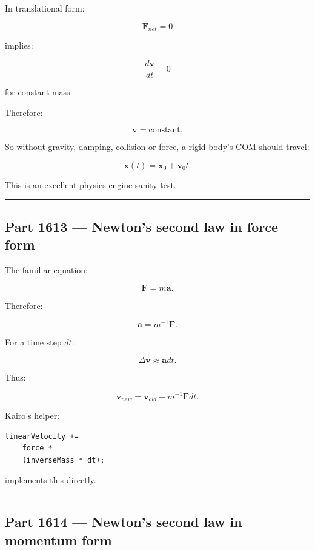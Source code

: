 In translational form:

\[
\mathbf{F}_{net}=0
\]

implies:

\[
\frac{d\mathbf{v}}{dt}=0
\]

for constant mass.

Therefore:

\[
\mathbf{v}=\text{constant}.
\]

So without gravity, damping, collision or force, a rigid body's COM should travel:

\[
\mathbf{x}(t)
=
\mathbf{x}_0
+
\mathbf{v}_0t.
\]

This is an excellent physics-engine sanity test.

\begin{center}\rule{0.5\linewidth}{0.5pt}\end{center}

\subsection{Part 1613 --- Newton's second law in force form}\label{06-engine-ii-ch034-part-1613-newtons-second-law-in-force-form}

\hypertarget{06-engine-ii-ch034-part-1613-newtons-second-law-in-force-form}{}

The familiar equation:

\[
\boxed{
\mathbf{F}=m\mathbf{a}.
}
\]

Therefore:

\[
\mathbf{a}
=
m^{-1}\mathbf{F}.
\]

For a time step \(dt\):

\[
\Delta\mathbf{v}
\approx
\mathbf{a}dt.
\]

Thus:

\[
\boxed{
\mathbf{v}_{new}
=
\mathbf{v}_{old}
+
m^{-1}\mathbf{F}dt.
}
\]

Kairo's helper:

\begin{verbatim}
linearVelocity +=
    force *
    (inverseMass * dt);
\end{verbatim}

implements this directly.

\begin{center}\rule{0.5\linewidth}{0.5pt}\end{center}

\subsection{Part 1614 --- Newton's second law in momentum form}\label{06-engine-ii-ch034-part-1614-newtons-second-law-in-momentum-form}

